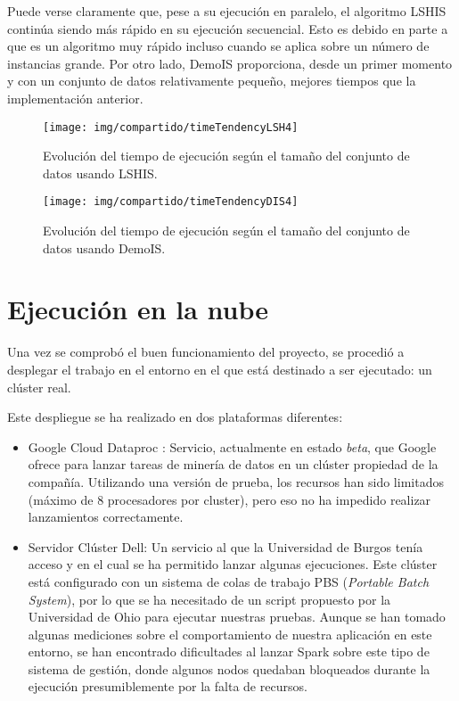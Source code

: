 Puede verse claramente que, pese a su ejecución en paralelo, el algoritmo LSHIS continúa siendo más rápido en su ejecución secuencial. Esto es debido en parte a que es un algoritmo muy rápido incluso cuando se aplica sobre un número de instancias grande. Por otro lado, DemoIS proporciona, desde un primer momento y con un conjunto de datos relativamente pequeño, mejores tiempos que la implementación anterior.

	\begin{figure}[!h]
		\centering
		\texttt{[image: img/compartido/timeTendencyLSH4]}
		\caption{Evolución del tiempo de ejecución según el tamaño del conjunto de datos usando LSHIS.}\label{fig:img/compartido/timeTendencyLSH4}
	\end{figure}
	
		\begin{figure}[!h]
		\centering
		\texttt{[image: img/compartido/timeTendencyDIS4]}
		\caption{Evolución del tiempo de ejecución según el tamaño del conjunto de datos usando DemoIS.}\label{fig:img/compartido/timeTendencyDIS4}
	\end{figure}
	\FloatBarrier


\section{Ejecución en la nube}\label{sec: ejecucionNube}

Una vez se comprobó el buen funcionamiento del proyecto, se procedió a desplegar el trabajo en el entorno en el que está destinado a ser ejecutado: un clúster real.

Este despliegue se ha realizado en dos plataformas diferentes:
\begin{itemize}
	\item Google Cloud Dataproc \cite{dataprocSoft}: Servicio, actualmente en estado \textit{beta}, que Google ofrece para lanzar tareas de minería de datos en un clúster propiedad de la compañía. Utilizando una versión de prueba, los recursos han sido limitados (máximo de 8 procesadores por cluster), pero eso no ha impedido realizar lanzamientos correctamente.  
	\item Servidor Clúster Dell: Un servicio al que la Universidad de Burgos tenía acceso y en el cual se ha permitido lanzar algunas ejecuciones. Este clúster está configurado con un sistema de colas de trabajo PBS (\textit{Portable Batch System}), por lo que se ha necesitado de un script propuesto por la Universidad de Ohio \cite{baer2015integrating} para ejecutar nuestras pruebas. Aunque se han tomado algunas mediciones sobre el comportamiento de nuestra aplicación en este entorno, se han encontrado dificultades al lanzar Spark sobre este tipo de sistema de gestión, donde algunos nodos quedaban bloqueados durante la ejecución presumiblemente por la falta de recursos.
\end{itemize}

